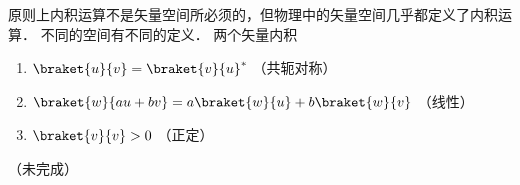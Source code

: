 

原则上内积运算不是矢量空间所必须的，但物理中的矢量空间几乎都定义了内积运算． 不同的空间有不同的定义． 两个矢量内积

\begin{enumerate}
\item $\braket{u}{v} = \braket{v}{u}^*$ （共轭对称）
\item $\braket{w}{a u + b v} = a\braket{w}{u} + b\braket{w}{v}$ （线性）
\item $\braket{v}{v} > 0$ （正定）
\end{enumerate}

（未完成）

